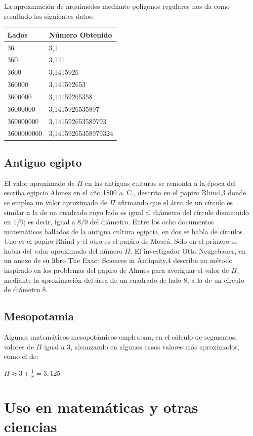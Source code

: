 \documentclass[spanish,11pt,a4paper]{article}
\begin{document}
La aproximación de arquímedes mediante polígonos regulares \cite{Ecamec} nos da como resultado los siguientes datos:

\begin{tabular}{ll}

Lados & Número Obtenido\\
\hline
36 & 3,1\\
360 & 3,141\\
3600 & 3,1415926\\
360000 & 3,141592653\\
3600000 & 3,14159265358\\
36000000 & 3,1415926535897\\
360000000 & 3,141592653589793\\
3600000000 & 3,14159265358979324

\end{tabular}


\subsection{Antiguo egipto}
El valor aproximado de $\Pi$ en las antiguas culturas se remonta a la época del escriba egipcio Ahmes en el año 1800 a. C., descrito en el papiro Rhind,3 donde se emplea un valor aproximado de $\Pi$ afirmando que el área de un círculo es similar a la de un cuadrado cuyo lado es igual al diámetro del círculo disminuido en 1/9; es decir, igual a 8/9 del diámetro. 
Entre los ocho documentos matemáticos hallados de la antigua cultura egipcia, en dos se habla de círculos. Uno es el papiro Rhind y el otro es el papiro de Moscú. Sólo en el primero se habla del valor aproximado del número $\Pi$. El investigador Otto Neugebauer, en un anexo de su libro The Exact Sciences in Antiquity,4 describe un método inspirado en los problemas del papiro de Ahmes para averiguar el valor de $\Pi$, mediante la aproximación del área de un cuadrado de lado 8, a la de un círculo de diámetro 8.

\subsection{Mesopotamia}
Algunos matemáticos mesopotámicos empleaban, en el cálculo de segmentos, valores de $\Pi$ igual a 3, alcanzando en algunos casos valores más aproximados, como el de:

\centerline{$\Pi \approx 3 + \frac{1}{8} = 3,125$} 

    
\section{Uso en matemáticas y otras ciencias}
\end{document}
